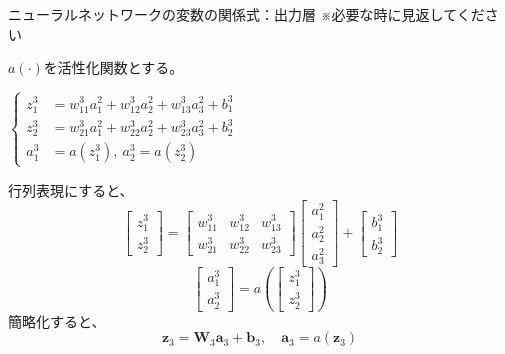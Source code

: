 \documentclass[dvipdfmx,aspectratio=169]{beamer}
\begin{document}
	\begin{frame}[allowframebreaks]{ニューラルネットワークの変数の関係式：出力層}
		※必要な時に見返してください\vspace{4em}
		
		$ a(\cdot) $を活性化関数とする。
		\begin{screen}
			$ \left\{
			\begin{aligned}
				z^3_1 &= w^3_{11}a^2_1 + w^3_{12}a^2_2 + w^3_{13}a^2_3 + b^3_1\\
				z^3_2 &= w^3_{21}a^2_1 + w^3_{22}a^2_2 + w^3_{23}a^2_3 + b^3_2\\
				a^3_1 &= a(z^3_1),\ a^3_2 = a(z^3_2)
			\end{aligned}
			\right. $
		\end{screen}
	
		
		行列表現にすると、
		\begin{equation*}
			\begin{bmatrix}
				z^3_1\\ z^3_2
			\end{bmatrix} = \begin{bmatrix}
				w^3_{11} & w^3_{12} & w^3_{13}\\
				w^3_{21} & w^3_{22} & w^3_{23}
			\end{bmatrix} \begin{bmatrix}
				a^2_1\\ a^2_2\\ a^2_3
			\end{bmatrix} + \begin{bmatrix}
				b^3_1\\ b^3_2
			\end{bmatrix}
		\end{equation*}
		\begin{equation*}
			\begin{bmatrix}
				a^3_1\\ a^3_2
			\end{bmatrix} = a\left(\begin{bmatrix}
				z^3_1\\ z^3_2
			\end{bmatrix}\right)
		\end{equation*}
		簡略化すると、
		\begin{equation*}
			\boldsymbol{z}_3 = \mathbf{W}_3\boldsymbol{a}_3 + \boldsymbol{b}_3,\quad \boldsymbol{a}_3 = a(\boldsymbol{z}_3)
		\end{equation*}
	\end{frame}
	
\end{document}
